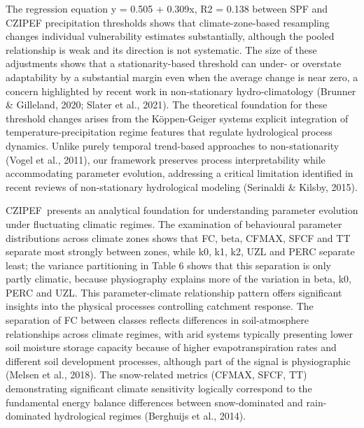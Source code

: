 \documentclass[
]{article}
\begin{document}
The regression equation y = 0.505 + 0.309x, R2 = 0.138 between SPF and
CZIPEF precipitation thresholds shows that climate-zone-based resampling
changes individual vulnerability estimates substantially, although the
pooled relationship is weak and its direction is not systematic. The
size of these adjustments shows that a stationarity-based threshold can
under- or overstate adaptability by a substantial margin even when the
average change is near zero, a concern highlighted by recent work in
non-stationary hydro-climatology (Brunner \& Gilleland, 2020; Slater et
al., 2021). The theoretical foundation for these threshold changes
arises from the Köppen-Geiger system\textquotesingle s explicit
integration of temperature-precipitation regime features that regulate
hydrological process dynamics. Unlike purely temporal trend-based
approaches to non-stationarity (Vogel et al., 2011), our framework
preserves process interpretability while accommodating parameter
evolution, addressing a critical limitation identified in recent reviews
of non-stationary hydrological modeling (Serinaldi \& Kilsby, 2015).

CZIPEF~presents an analytical foundation for understanding parameter
evolution under fluctuating climatic regimes. The examination of
behavioural parameter distributions across climate zones shows that FC,
beta, CFMAX, SFCF and TT separate most strongly between zones, while k0,
k1, k2, UZL and PERC separate least; the variance partitioning in Table
6 shows that this separation is only partly climatic, because
physiography explains more of the variation in beta, k0, PERC and UZL.
This parameter-climate relationship pattern offers significant insights
into the physical processes controlling catchment response. The
separation of FC between classes reflects differences in soil-atmosphere
relationships across climate regimes, with arid systems typically
presenting lower soil moisture storage capacity because of higher
evapotranspiration rates and different soil development processes,
although part of the signal is physiographic (Melsen et al., 2018). The
snow-related metrics (CFMAX, SFCF, TT) demonstrating significant climate
sensitivity logically correspond to the fundamental energy balance
differences between snow-dominated and rain-dominated hydrological
regimes (Berghuijs et al., 2014).
\end{document}
